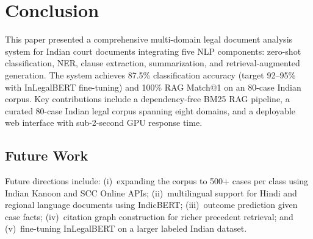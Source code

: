 \documentclass[conference]{IEEEtran}
\begin{document}
\section{Conclusion}

This paper presented a comprehensive multi-domain legal document analysis
system for Indian court documents integrating five NLP components:
zero-shot classification, NER, clause extraction, summarization, and
retrieval-augmented generation. The system achieves 87.5\% classification
accuracy (target 92--95\% with InLegalBERT fine-tuning) and 100\% RAG
Match@1 on an 80-case Indian corpus. Key contributions include a
dependency-free BM25 RAG pipeline, a curated 80-case Indian legal corpus
spanning eight domains, and a deployable web interface with sub-2-second
GPU response time.

\subsection*{Future Work}
Future directions include: (i)~expanding the corpus to 500+ cases per class
using Indian Kanoon and SCC Online APIs; (ii)~multilingual support for
Hindi and regional language documents using IndicBERT; (iii)~outcome
prediction given case facts; (iv)~citation graph construction for richer
precedent retrieval; and (v)~fine-tuning InLegalBERT on a larger labeled
Indian dataset.
\end{document}
